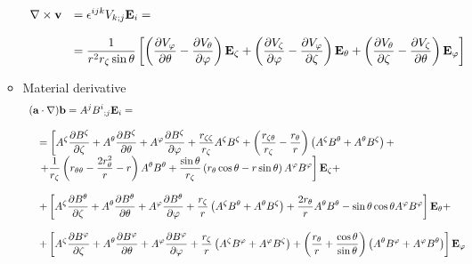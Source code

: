 \begin{itemize}
\begin{itemize}
\begin{equation}
\begin{array}{rl}
\displaystyle \nabla\times\mathbf{v} &
\displaystyle = \epsilon^{ijk}V_{k;j}\mathbf{E}_i=\\
\\
&\displaystyle = \frac{1}{r^2r_\zeta\sin\theta}\left[
\left(\frac{\partial V_\varphi}{\partial\theta}-
\frac{\partial V_\theta}{\partial\varphi}\right)\mathbf{E}_\zeta +
\left(\frac{\partial V_\zeta}{\partial\varphi}-
\frac{\partial V_\varphi}{\partial\zeta}\right)\mathbf{E}_\theta +
\left(\frac{\partial V_\theta}{\partial\zeta}-
\frac{\partial V_\zeta}{\partial\theta}\right)\mathbf{E}_\varphi\right]\\
\end{array}
\end{equation}
\item Material derivative
\begin{equation}
\begin{array}{l}
\displaystyle(\mathbf{a}\cdot\nabla)\mathbf{b}
 =A^j{B^i}_{;j}\mathbf{E}_i=\\
\\
\quad\displaystyle =\left[A^\zeta\frac{\partial B^\zeta}{\partial\zeta}+
A^\theta\frac{\partial B^\zeta}{\partial\theta}+A^\varphi\frac{\partial B^\zeta}{\partial\varphi}
+\frac{r_{\zeta\zeta}}{r_\zeta}A^\zeta B^\zeta+\left(\frac{r_{\zeta\theta}}{r_\zeta}-\frac{r_\theta}{r}
\right)\left(A^\zeta B^\theta+A^\theta B^\zeta\right)+\right.\\
\quad\displaystyle \left. +\frac{1}{r_\zeta}\left(r_{\theta\theta}-
\frac{2r_\theta^2}{r}-r\right)A^\theta B^\theta+\frac{\sin\theta}{r_\zeta}\left(
r_\theta\cos\theta-r\sin\theta\right)A^\varphi B^{\varphi}\right]\mathbf{E}_\zeta +\\
\\
\quad\displaystyle +\left[A^\zeta\frac{\partial B^\theta}{\partial\zeta}+
A^\theta\frac{\partial B^\theta}{\partial\theta}+A^\varphi\frac{\partial B^\theta}{\partial\varphi}
+\frac{r_\zeta}{r}\left(A^\zeta B^\theta+A^\theta B^\zeta\right)
+\frac{2r_\theta}{r}A^\theta B^\theta-
\sin\theta\cos\theta A^\varphi B^{\varphi}\right]\mathbf{E}_\theta +\\
\\
\quad\displaystyle +\left[A^\zeta\frac{\partial B^\varphi}{\partial\zeta}+
A^\theta\frac{\partial B^\varphi}{\partial\theta}+A^\varphi\frac{\partial B^\varphi}{\partial\varphi}
+\frac{r_\zeta}{r}\left(A^\zeta B^\varphi+A^\varphi B^\zeta\right)
+\left(\frac{r_\theta}{r}+\frac{\cos\theta}{\sin\theta}\right)
\left(A^\theta B^\varphi+A^\varphi B^\theta\right)\right]\mathbf{E}_\varphi\\

\end{array}
\end{equation}
\end{itemize}
\end{itemize}

